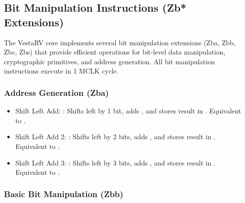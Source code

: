 \documentclass[11pt,pdftex,portrait,letterpaper]{article}
\begin{document}
\subsection{Bit Manipulation Instructions (Zb* Extensions)}

The VestaRV core implements several bit manipulation extensions (Zba, Zbb, Zbc, Zbs) that provide efficient operations for bit-level data manipulation, cryptographic primitives, and address generation. All bit manipulation instructions execute in 1 MCLK cycle.

\subsubsection{Address Generation (Zba)}

\begin{itemize}
	\item Shift Left Add: : Shifts  left by 1 bit, adds , and stores result in . Equivalent to .
	\item Shift Left Add 2: : Shifts  left by 2 bits, adds , and stores result in . Equivalent to .
	\item Shift Left Add 3: : Shifts  left by 3 bits, adds , and stores result in . Equivalent to .
\end{itemize}

\subsubsection{Basic Bit Manipulation (Zbb)}
\end{document}
